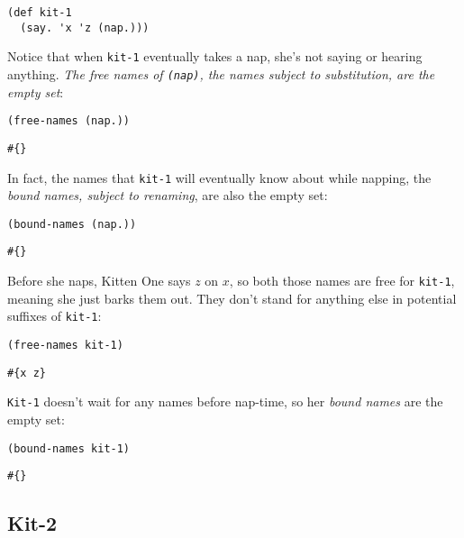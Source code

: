 \documentclass[10pt,oneside,x11names]{article}
\theoremstyle{definition}
\theoremstyle{warning}
\begin{document}
\vskip 0.26cm
\begin{verbatim}
(def kit-1
  (say. 'x 'z (nap.)))
\end{verbatim}

Notice that when \texttt{kit-1} eventually takes a nap, she's not
saying or hearing anything. \emph{The free names of \texttt{(nap)}, the
names subject to substitution, are the empty set}:

\vskip 0.26cm
\begin{verbatim}
(free-names (nap.))
\end{verbatim}

\begin{verbatim}
#{}
\end{verbatim}


In fact, the names that \texttt{kit-1} will eventually know about while
napping, the \emph{bound names, subject to renaming}, are also the
empty set:

\vskip 0.26cm
\begin{verbatim}
(bound-names (nap.))
\end{verbatim}

\begin{verbatim}
#{}
\end{verbatim}


Before she naps, Kitten One says \(z\) on \(x\), so both those names
are free for \texttt{kit-1}, meaning she just barks them out. They don't
stand for anything else in potential suffixes of \texttt{kit-1}:

\vskip 0.26cm
\begin{verbatim}
(free-names kit-1)
\end{verbatim}

\begin{verbatim}
#{x z}
\end{verbatim}


\texttt{Kit-1} doesn't wait for any names before nap-time, so her
\emph{bound names} are the empty set:

\vskip 0.26cm
\begin{verbatim}
(bound-names kit-1)
\end{verbatim}

\begin{verbatim}
#{}
\end{verbatim}

\subsection{Kit-2}
\label{sec:org172af4d}
\end{document}
